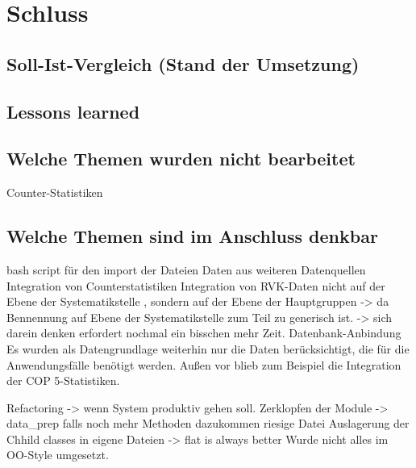 
\chapter{Schluss}
\label{chap:six}
\section{Soll-Ist-Vergleich (Stand der Umsetzung)}
\section{Lessons learned}
\section{Welche Themen wurden nicht bearbeitet}
Counter-Statistiken

\section{Welche Themen sind im Anschluss denkbar}
bash script für den import der Dateien
Daten aus weiteren Datenquellen
Integration von Counterstatistiken
Integration von RVK-Daten nicht auf der Ebene der Systematikstelle , sondern auf der Ebene
der Hauptgruppen -> da Bennennung auf Ebene der Systematikstelle zum Teil zu generisch ist. 
-> sich darein denken erfordert nochmal ein bisschen mehr Zeit.
Datenbank-Anbindung
Es wurden als Datengrundlage weiterhin nur die Daten berücksichtigt, 
    die für die Anwendungsfälle benötigt werden. Außen vor blieb zum Beispiel die Integration der \acrshort{COP 5}-Statistiken.

Refactoring -> wenn System produktiv gehen soll.
Zerklopfen der Module -> data\_prep falls noch mehr Methoden dazukommen  riesige Datei Auslagerung der Chhild classes in eigene Dateien
-> flat is always better
Wurde nicht alles im OO-Style umgesetzt.